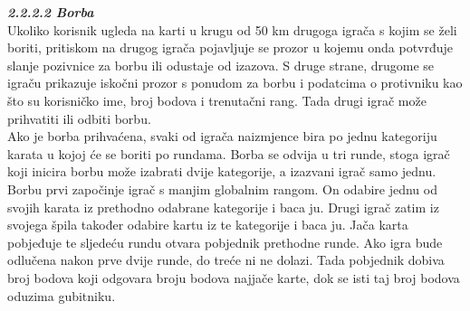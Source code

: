 		\textbf{\textit{\small2.2.2.2 Borba}}\\
		{Ukoliko korisnik ugleda na karti u krugu od 50 km drugoga igrača s kojim se želi boriti, pritiskom na drugog igrača pojavljuje se prozor u kojemu onda potvrđuje slanje pozivnice za borbu ili odustaje od izazova. S druge strane, drugome se  igraču prikazuje iskočni prozor s ponudom za borbu i podatcima o protivniku kao što su korisničko ime, broj bodova i trenutačni rang. Tada drugi igrač može prihvatiti ili odbiti borbu. \\ Ako je borba prihvaćena, svaki od igrača naizmjence bira po jednu kategoriju karata u kojoj će se boriti po rundama. Borba se odvija u tri runde, stoga igrač koji inicira borbu može izabrati dvije kategorije, a izazvani igrač samo jednu. Borbu prvi započinje igrač s manjim globalnim rangom. On odabire jednu od svojih karata iz prethodno odabrane kategorije i baca ju. Drugi igrač zatim iz svojega špila također odabire kartu iz te kategorije i baca ju. Jača karta pobjeđuje te sljedeću rundu otvara pobjednik prethodne runde. Ako igra bude odlučena nakon prve dvije runde, do treće ni ne dolazi. Tada pobjednik dobiva broj bodova koji odgovara broju bodova najjače karte, dok se isti taj broj bodova oduzima gubitniku. }
		
		
		\eject
	